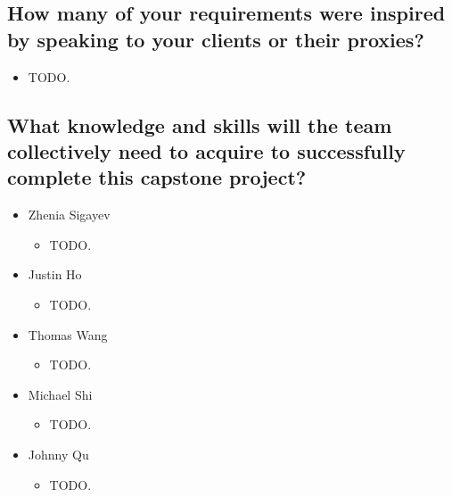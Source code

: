 \documentclass[12pt]{article}
\begin{document}
  \subsection{How many of your requirements were inspired by speaking to your clients or their proxies?}
    \begin{itemize}
      \item TODO.
    \end{itemize}

  \subsection{What knowledge and skills will the team collectively need to acquire to
    successfully complete this capstone project?}
  \begin{itemize}
    \item Zhenia Sigayev
      \begin{itemize}[label=$\circ$]
        \item TODO.
      \end{itemize}
    \item Justin Ho
      \begin{itemize}[label=$\circ$]
        \item TODO.
      \end{itemize}
    \item Thomas Wang
      \begin{itemize}[label=$\circ$]
        \item TODO.
      \end{itemize}
    \item Michael Shi
      \begin{itemize}[label=$\circ$]
        \item TODO.
      \end{itemize}
    \item Johnny Qu
      \begin{itemize}[label=$\circ$]
        \item TODO.
      \end{itemize}
  \end{itemize}
\end{document}
